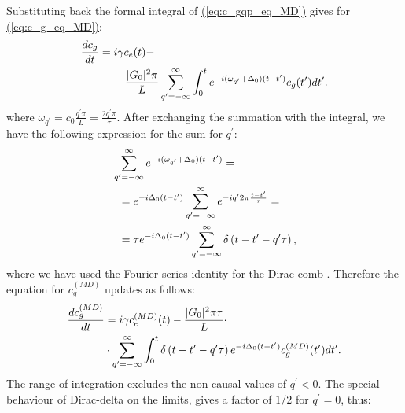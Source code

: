 \documentclass[%
 reprint,
 amsmath,amssymb,
pra,
]{revtex4-1}
\def\qp{{q^\prime}}
\def\qp{{q^\prime}}
\def\tp{{t^\prime}}
\def\nn{\nonumber}
\newcommand{\lsz}{\left[}
\newcommand{\rsz}{\right]}
\newcommand{\lk}{\left(}
\newcommand{\rk}{\right)}
\def\refeq#1{{\hyperref[#1]{(\ref*{#1})}}}
\newcommand\note[1]{{\color{red}{#1}}}
\begin{document}
Substituting back the formal integral of \refeq{eq:c_gqp_eq_MD} gives for \refeq{eq:c_g_eq_MD}:
\begin{align}
\frac{dc_g}{dt} &= i\gamma c_e(t) - \nn\\
&\hspace{.4cm}-\frac{|G_0|^2\pi}{L}\sum_{\qp=-\infty}^{\infty}
\int_0^te^{-i(\omega_\qp+\Delta_0) (t-\tp)} c_{g}(\tp)d\tp\nn.
\end{align}
where $\omega_\qp = c_0\frac{\qp\pi}{L}=\frac{2\qp\pi}{\tau}$. After exchanging the summation with the integral, we have the following expression for the sum for $\qp$:
\begin{align}
&\sum_{\qp=-\infty}^{\infty}e^{-i(\omega_\qp+\Delta_0) (t-\tp)} =\nn\\
&\hspace{.2cm}= e^{-i\Delta_0 (t-\tp)}\sum_{\qp=-\infty}^{\infty}e^{-i\qp 2\pi \frac{t-\tp}{\tau}} = \nn\\
&\hspace{.2cm}=\tau e^{-i\Delta_0 (t-\tp)}\sum_{\qp = -\infty}^\infty\delta\lk t-\tp-\qp\tau\rk,
\end{align}
where we have used the Fourier series identity for the Dirac comb \note{(reference?)}. Therefore the equation for $c_g^{(MD)}$ updates as follows:
\begin{align}
\frac{dc_g^{(MD)}}{dt} &= i\gamma c_e^{(MD)}(t) -\frac{|G_0|^2\pi\tau}{L}\cdot\nn\\%
&\hspace{0.0cm}\cdot
\sum_{\qp=-\infty}^{\infty}\int_0^t\delta\lk t-\tp-\qp\tau\rk e^{-i\Delta_0(t-\tp)} c_{g}^{(MD)}(\tp)d\tp.\nn
\end{align}
The range of integration excludes the non-causal values of $\qp<0$. The special behaviour of Dirac-delta on the limits, gives a factor of $1/2$ for $\qp=0$, thus:
\end{document}
